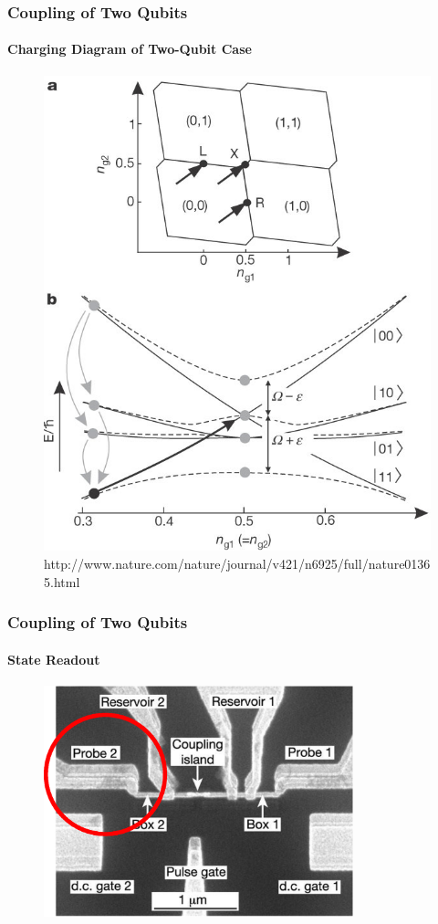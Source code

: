 \documentclass{beamer}
\begin{document}
\begin{frame}
    \frametitle{Coupling of Two Qubits}
    \framesubtitle{Charging Diagram of Two-Qubit Case}
        \begin{figure}[ht!]
            \centering
            \includegraphics[height=0.6\textheight]{img/charging-diagram.jpg}
            \caption{http://www.nature.com/nature/journal/v421/n6925/full/nature01365.html}
        \end{figure}
\end{frame}


\begin{frame}
    \frametitle{Coupling of Two Qubits}
    \framesubtitle{State Readout}
    \begin{figure}[!htb]
        \centering
        \includegraphics[width=0.8\textwidth]{img/two-qubit-sem-probe.eps}
    \end{figure}
\end{frame}
\end{document}
